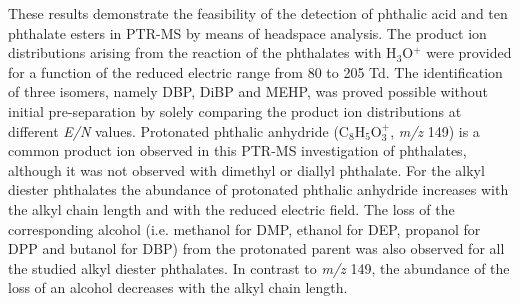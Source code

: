 These results demonstrate the feasibility of the detection of phthalic acid and ten phthalate esters in PTR-MS by means of headspace analysis. 
%
The product ion distributions arising from the reaction of the phthalates with H$_3$O$^+$ were provided for a function of the reduced electric range from 80 to 205 Td.
%
The identification of three isomers, namely  DBP, DiBP and MEHP, was proved possible without initial pre-separation by solely comparing the product ion distributions at different \textit{E/N} values.
%
Protonated phthalic anhydride (C$_8$H$_5$O$_3^+$, \textit{m/z} 149) is a common product ion observed in this PTR-MS investigation of phthalates, although it was not observed with dimethyl or diallyl phthalate.
%
For the alkyl diester phthalates the abundance of protonated phthalic anhydride  increases with the alkyl chain length and with the reduced electric field.
%
The loss of the corresponding alcohol (i.e. methanol for DMP, ethanol for DEP, propanol for DPP and butanol for DBP) from the protonated parent was also observed for all the studied alkyl diester phthalates.
%
In contrast to \textit{m/z} 149, the abundance of the loss of an alcohol decreases with the alkyl chain length. 






































